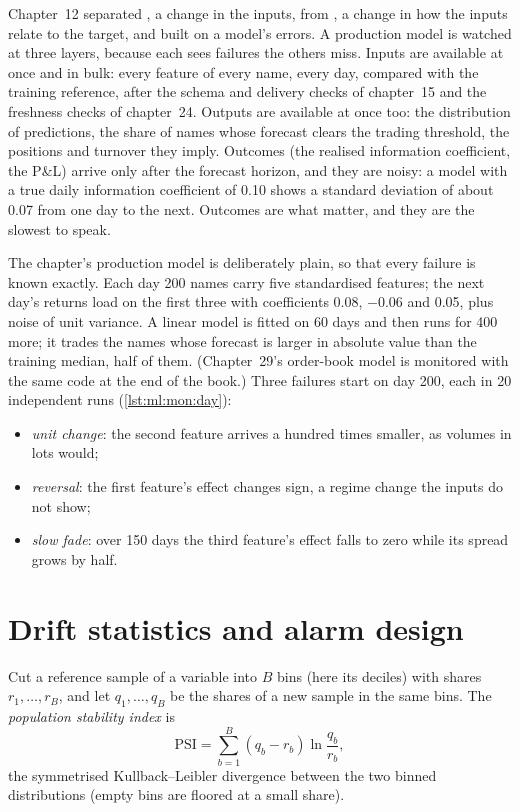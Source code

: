 Chapter~12 separated , a change in the inputs, from , a change in how the inputs relate to the
target, and built  on a model's errors. A production model is watched at three layers, because each sees failures
the others miss. Inputs are available at once and in bulk: every feature of every name, every day, compared with the training
reference, after the schema and delivery checks of chapter~15 and the freshness checks of chapter~24. Outputs are available at
once too: the distribution of predictions, the share of names whose forecast clears the trading threshold, the positions and
turnover they imply. Outcomes (the realised information coefficient, the P\&L) arrive only after the forecast horizon, and they
are noisy: a model with a true daily information coefficient of 0.10 shows a standard deviation of about 0.07 from one day to the
next. Outcomes are what matter, and they are the slowest to speak.

The chapter's production model is deliberately plain, so that every failure is known exactly. Each day 200 names carry five
standardised features; the next day's returns load on the first three with coefficients 0.08, $-0.06$ and 0.05, plus noise of
unit variance. A linear model is fitted on 60 days and then runs for 400 more; it trades the names whose forecast is larger in
absolute value than the training median, half of them. (Chapter~29's order-book model is monitored with the same code at the end
of the book.) Three failures start on day 200, each in 20 independent runs (\cref{lst:ml:mon:day}):
\begin{itemize}
\item \emph{unit change}: the second feature arrives a hundred times smaller, as volumes in lots would;
\item \emph{reversal}: the first feature's effect changes sign, a regime change the inputs do not show;
\item \emph{slow fade}: over 150 days the third feature's effect falls to zero while its spread grows by half.
\end{itemize}

\section{Drift statistics and alarm design}

\begin{definition}\label{def:ml:monitoring-and-retraining:psi}
Cut a reference sample of a variable into $B$ bins (here its deciles) with shares $r_1,\dots,r_B$, and let $q_1,\dots,q_B$ be the
shares of a new sample in the same bins. The \emph{population stability index} is
\[
\mathrm{PSI}=\sum_{b=1}^{B}(q_b-r_b)\ln\frac{q_b}{r_b},
\]
the symmetrised Kullback--Leibler divergence between the two binned distributions (empty bins are floored at a small share).
\end{definition}

